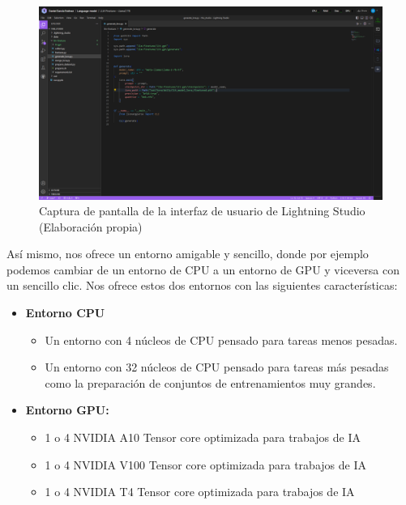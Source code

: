 \begin{figure}[H]
    \begin{center}
      \includegraphics[scale=0.3]{figuras/Capitulo_08/Lightning_Studio.png}
    \end{center}
    \caption[Captura de pantalla de la interfaz de usuario de Lightning Studio]{Captura de pantalla de la interfaz de usuario de Lightning Studio (Elaboración propia)}
    \label{fig:lightning_ia_studio}
\end{figure}

Así mismo, nos ofrece un entorno amigable y sencillo, donde por ejemplo podemos cambiar de
un entorno de CPU a un entorno de GPU y viceversa con un sencillo clic. Nos ofrece estos dos
entornos con las siguientes características:

\begin{itemize}
    \item \textbf{Entorno CPU}
    \begin{itemize}
        \item Un entorno con 4 núcleos de CPU pensado para tareas menos pesadas.
        \item Un entorno con 32 núcleos de CPU pensado para tareas más pesadas como la preparación de conjuntos de entrenamientos muy grandes.
    \end{itemize}
    \item \textbf{Entorno GPU: }
    \begin{itemize}
        \item 1 o 4 NVIDIA A10 Tensor core optimizada para trabajos de IA
        \item 1 o 4 NVIDIA V100 Tensor core optimizada para trabajos de IA
        \item 1 o 4 NVIDIA T4 Tensor core optimizada para trabajos de IA
    \end{itemize}
\end{itemize}

